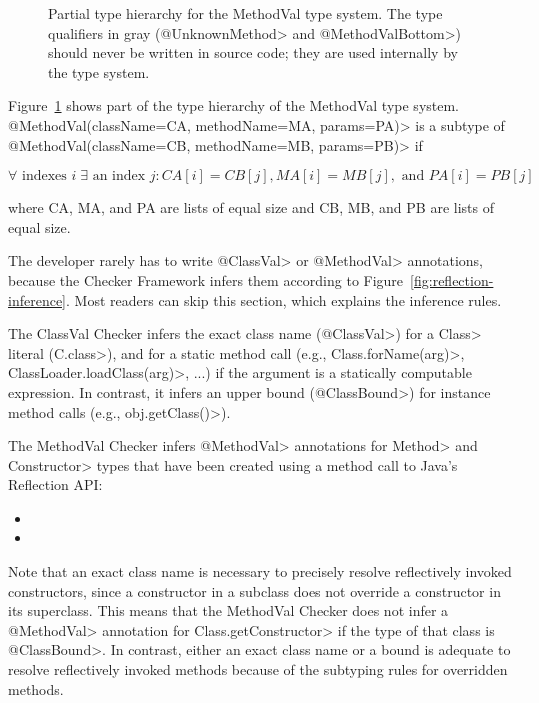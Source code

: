 \begin{figure}
\caption{Partial type hierarchy for the MethodVal type system. The type qualifiers in gray (\<@UnknownMethod>
and \<@MethodValBottom>) should never be written in source code; they are used internally by the type system.}
\label{fig-methodval-hierarchy}
\end{figure}

Figure~\ref{fig-methodval-hierarchy} shows part of the type hierarchy of the
MethodVal type system.  \<@MethodVal(className=CA, methodName=MA, params=PA)> is a subtype of
\<@MethodVal(className=CB, methodName=MB, params=PB)> if

\[\forall \textrm{ indexes } i \; \exists \textrm{ an index } j:  CA[i] = CB[j], MA[i] = MB[j], \textrm{ and } PA[i] = PB[j]\]

\noindent
where CA, MA, and PA are lists of equal size and CB, MB, and PB are lists of equal size.




The developer rarely has to write \<@ClassVal> or \<@MethodVal>
annotations, because the Checker Framework infers them according to
Figure~\ref{fig:reflection-inference}.  Most readers can skip this
section, which explains the inference rules.



The ClassVal Checker infers the exact class name (\<@ClassVal>) for a
\<Class> literal (\<C.class>), and for a static method call (e.g.,
\<Class.forName(arg)>, \<ClassLoader.loadClass(arg)>, ...) if the argument is a
statically computable expression.  In contrast, it infers an upper bound
(\<@ClassBound>) for instance method calls (e.g., \<obj.getClass()>).

The MethodVal Checker infers \<@MethodVal> annotations for \<Method> and
\<Constructor> types that have been created using a method call to Java's Reflection
API\@:
\begin{itemize}
    \item {}
    \item {}
\end{itemize}

Note that an exact class name is necessary to precisely resolve
reflectively invoked constructors, since a constructor in a subclass does not
override a constructor in its superclass. This means that the MethodVal Checker
does not infer a \<@MethodVal> annotation for \<Class.getConstructor> if the
type of that class is \<@ClassBound>. In contrast, either an exact class name or a bound
is adequate to resolve reflectively invoked methods because of the subtyping
rules for overridden methods.


